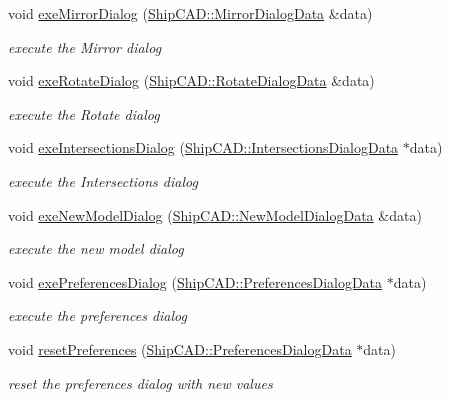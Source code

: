 \begin{DoxyCompactItemize}
void \hyperlink{classShipCAD_1_1Controller_a9a8b6fae50e279373d795f654de16e60}{exe\+Mirror\+Dialog} (\hyperlink{structShipCAD_1_1MirrorDialogData}{Ship\+C\+A\+D\+::\+Mirror\+Dialog\+Data} \&data)
\begin{DoxyCompactList}\small\item\em execute the Mirror dialog \end{DoxyCompactList}\item 
void \hyperlink{classShipCAD_1_1Controller_af7511bdc37081194facf5169c91cee28}{exe\+Rotate\+Dialog} (\hyperlink{structShipCAD_1_1RotateDialogData}{Ship\+C\+A\+D\+::\+Rotate\+Dialog\+Data} \&data)
\begin{DoxyCompactList}\small\item\em execute the Rotate dialog \end{DoxyCompactList}\item 
void \hyperlink{classShipCAD_1_1Controller_afbadc6404e43960f4f41d37832a2c8a6}{exe\+Intersections\+Dialog} (\hyperlink{structShipCAD_1_1IntersectionsDialogData}{Ship\+C\+A\+D\+::\+Intersections\+Dialog\+Data} $\ast$data)
\begin{DoxyCompactList}\small\item\em execute the Intersections dialog \end{DoxyCompactList}\item 
void \hyperlink{classShipCAD_1_1Controller_a3db63580c7b845824545c393a4f3406a}{exe\+New\+Model\+Dialog} (\hyperlink{structShipCAD_1_1NewModelDialogData}{Ship\+C\+A\+D\+::\+New\+Model\+Dialog\+Data} \&data)
\begin{DoxyCompactList}\small\item\em execute the new model dialog \end{DoxyCompactList}\item 
void \hyperlink{classShipCAD_1_1Controller_a4ad96e74ba77d8aa97f650277d06f00c}{exe\+Preferences\+Dialog} (\hyperlink{structShipCAD_1_1PreferencesDialogData}{Ship\+C\+A\+D\+::\+Preferences\+Dialog\+Data} $\ast$data)
\begin{DoxyCompactList}\small\item\em execute the preferences dialog \end{DoxyCompactList}\item 
void \hyperlink{classShipCAD_1_1Controller_a3652d77f4d1f23eb6bb546e3f7e41b55}{reset\+Preferences} (\hyperlink{structShipCAD_1_1PreferencesDialogData}{Ship\+C\+A\+D\+::\+Preferences\+Dialog\+Data} $\ast$data)
\begin{DoxyCompactList}\small\item\em reset the preferences dialog with new values \end{DoxyCompactList}\item 

\end{DoxyCompactItemize}
